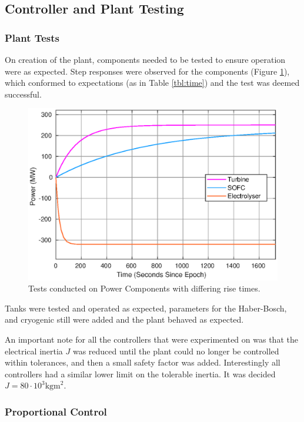 \subsection{Controller and Plant Testing}
\label{sec:pwrtesting}

\subsubsection{Plant Tests}

On creation of the plant, components needed to be tested to ensure operation were as expected.
Step responses were observed for the components (Figure \ref{fig:power-risetime}), which conformed to expectations (as in Table \ref{tbl:time}) and the test was deemed successful.

\begin{figure}
    \centering
    \includegraphics[scale=0.5]{images/results/risetime.eps}
    \caption{Tests conducted on Power Components with differing rise times.}
    \label{fig:power-risetime}
\end{figure}

Tanks were tested and operated as expected, parameters for the Haber-Bosch, and cryogenic still were added and the plant behaved as expected.

An important note for all the controllers that were experimented on was that the electrical inertia $J$ was reduced until the plant could no longer be controlled within tolerances, and then a small safety factor was added.
Interestingly all controllers had a similar lower limit on the tolerable inertia.
It was decided $J = 80 \cdot 10^{3}\text{kgm}^{2}$.

\subsubsection{Proportional Control}

